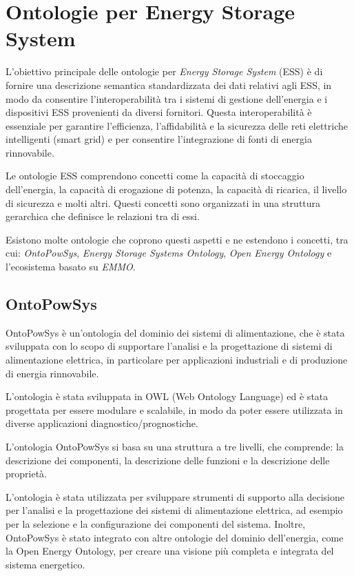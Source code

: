 \chapter{Ontologie per Energy Storage System}

L'obiettivo principale delle ontologie per \textit{Energy Storage System} (ESS)
è di fornire una descrizione
semantica standardizzata dei dati relativi agli ESS, in modo da consentire
l'interoperabilità tra i sistemi di gestione dell'energia e i dispositivi ESS
provenienti da diversi fornitori. Questa interoperabilità è essenziale per
garantire l'efficienza, l'affidabilità e la sicurezza delle reti elettriche
intelligenti (smart grid) e per consentire l'integrazione di fonti di energia
rinnovabile.

Le ontologie ESS comprendono concetti come la capacità di stoccaggio
dell'energia, la capacità di erogazione di potenza, la capacità di ricarica, il
livello di sicurezza e
molti altri. Questi concetti sono organizzati in una struttura gerarchica che
definisce le relazioni tra di essi.

Esistono molte ontologie che coprono questi aspetti e ne estendono i concetti,
tra cui: \textit{OntoPowSys}, \textit{Energy Storage Systems Ontology},
\textit{Open Energy Ontology} e l'ecosistema basato su \textit{EMMO}.

\section{OntoPowSys}
OntoPowSys è un'ontologia del dominio dei sistemi di alimentazione, che è stata
sviluppata con lo scopo di supportare l'analisi e la progettazione di sistemi
di alimentazione elettrica, in particolare per applicazioni industriali e di
produzione di energia rinnovabile.

L'ontologia è stata sviluppata in OWL (Web Ontology Language) ed è stata
progettata per essere modulare e scalabile, in modo da poter essere utilizzata
in diverse applicazioni diagnostico/prognostiche.

L'ontologia OntoPowSys si basa su una struttura a tre livelli, che comprende:
la descrizione dei componenti, la descrizione delle funzioni e la descrizione
delle proprietà.

L'ontologia è stata utilizzata per sviluppare strumenti di supporto alla
decisione per l'analisi e la progettazione dei sistemi di alimentazione
elettrica, ad esempio per la selezione e la configurazione dei componenti del
sistema. Inoltre, OntoPowSys è stato integrato con altre ontologie del dominio
dell'energia, come la Open Energy Ontology, per creare una visione più completa
e integrata del sistema energetico.

